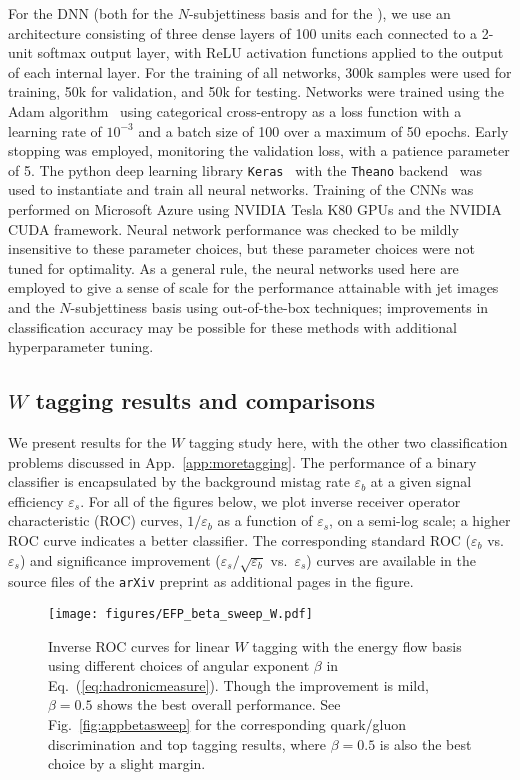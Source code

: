 \documentclass[letterpaper,11pt]{article}
\DeclareRobustCommand{\App}[1]{App.~\ref{#1}}
\DeclareRobustCommand{\Fig}[1]{Fig.~\ref{#1}}
\DeclareRobustCommand{\Eq}[1]{Eq.~(\ref{#1})}
\newcommand{\Bs}{\text{EFPs}\xspace}
\begin{document}
For the DNN (both for the $N$-subjettiness basis and for the \Bs), we use an architecture consisting of three dense layers of 100 units each connected to a 2-unit softmax output layer, with ReLU activation functions applied to the output of each internal layer.
%
For the training of all networks, 300k samples were used for training, 50k for validation, and 50k for testing.
%
Networks were trained using the Adam algorithm~\cite{adam} using categorical cross-entropy as a loss function with a learning rate of $10^{-3}$ and a batch size of 100 over a maximum of 50 epochs. 
%
Early stopping was employed, monitoring the validation loss, with a patience parameter of 5.
%
The python deep learning library {\tt Keras}~\cite{keras} with the {\tt Theano} backend~\cite{bergstra2010theano} was used to instantiate and train all neural networks.
%
Training of the CNNs was performed on Microsoft Azure using NVIDIA Tesla K80 GPUs and the NVIDIA CUDA framework.
%
Neural network performance was  checked to be mildly insensitive to these parameter choices, but these parameter choices were not tuned for optimality.
%
As a general rule, the neural networks used here are employed to give a sense of scale for the performance attainable with jet images and the $N$-subjettiness basis using out-of-the-box techniques; improvements in classification accuracy may be possible for these methods with additional hyperparameter tuning. 


\subsection{$W$ tagging results and comparisons}
\label{sec:perf}

We present results for the $W$ tagging study here, with the other two classification problems discussed in \App{app:moretagging}.
%
The performance of a binary classifier is encapsulated by the background mistag rate $\varepsilon_b$ at a given signal efficiency $\varepsilon_s$.
%
For all of the figures below, we plot inverse receiver operator characteristic (ROC) curves, $1/\varepsilon_b$ as a function of $\varepsilon_s$, on a semi-log scale; a higher ROC curve indicates a better classifier.
%
The corresponding standard ROC ($\varepsilon_b$ vs.\ $\varepsilon_s$) and significance improvement ($\varepsilon_s/\sqrt{\varepsilon_b}$ vs.\ $\varepsilon_s$) curves are available in the source files of the {\tt arXiv} preprint as additional pages in the figure.

\begin{figure}[t]
\centering
\texttt{[image: figures/EFP\_beta\_sweep\_W.pdf]}
\caption{Inverse ROC curves for linear $W$ tagging with the energy flow basis using different choices of angular exponent $\beta$ in \Eq{eq:hadronicmeasure}. Though the improvement is mild, $\beta=0.5$ shows the best overall performance. See \Fig{fig:appbetasweep} for the corresponding quark/gluon discrimination and top tagging results, where $\beta=0.5$ is also the best choice by a slight margin.}
\label{fig:Wbetasweep} 
\end{figure}
\end{document}
